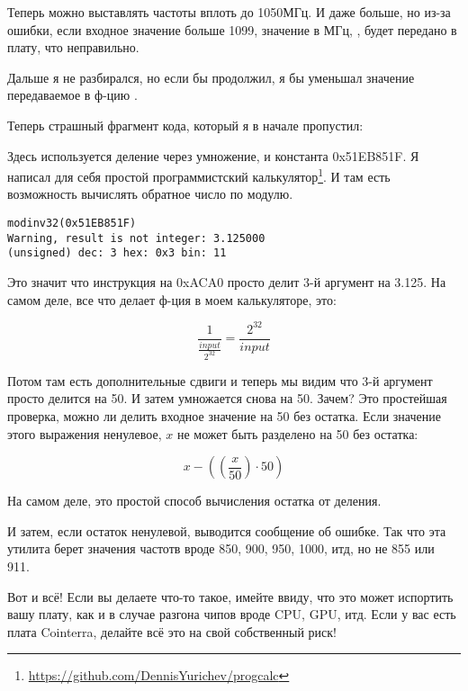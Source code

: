 Теперь можно выставлять частоты вплоть до 1050МГц. И даже больше, но из-за ошибки, если входное значение больше 1099,
значение в МГц, , будет передано в плату, что неправильно.

Дальше я не разбирался, но если бы продолжил, я бы уменьшал значение передаваемое в ф-цию .

Теперь страшный фрагмент кода, который я в начале пропустил:



Здесь используется деление через умножение, и константа 0x51EB851F.
Я написал для себя простой программистский калькулятор\footnote{\url{https://github.com/DennisYurichev/progcalc}}.
И там есть возможность вычислять обратное число по модулю.

\begin{lstlisting}
modinv32(0x51EB851F)
Warning, result is not integer: 3.125000
(unsigned) dec: 3 hex: 0x3 bin: 11
\end{lstlisting}

Это значит что инструкция  на 0xACA0 просто делит 3-й аргумент на 3.125.
На самом деле, все что делает ф-ция  в моем калькуляторе, это:

\[
\frac{1}{\frac{input}{2^{32}}} = \frac{2^{32}}{input}
\]

Потом там есть дополнительные сдвиги и теперь мы видим что 3-й аргумент просто делится на 50.
И затем умножается снова на 50.
Зачем?
Это простейшая проверка, можно ли делить входное значение на 50 без остатка.
Если значение этого выражения ненулевое, $x$ не может быть разделено на 50 без остатка:

\[
x-((\frac{x}{50}) \cdot 50)
\]

На самом деле, это простой способ вычисления остатка от деления.

И затем, если остаток ненулевой, выводится сообщение об ошибке.
Так что эта утилита берет значения частотв вроде 850, 900, 950, 1000, итд, но не 855 или 911.

Вот и всё! Если вы делаете что-то такое, имейте ввиду, что это может испортить вашу плату, как и в случае разгона
чипов вроде \ac{CPU}, \ac{GPU}, итд.
Если у вас есть плата Cointerra, делайте всё это на свой собственный риск!

